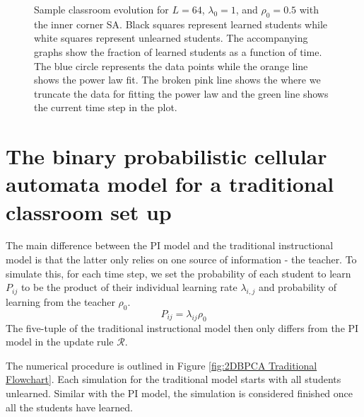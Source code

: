 \begin{figure}[htbp!]
    \caption{Sample classroom evolution for $L=64$, $\lambda_0 = 1$, and $\rho_0 = 0.5$ with the inner corner SA. Black squares represent learned students while white squares represent unlearned students. The accompanying graphs show the fraction of learned students as a function of time. The blue circle represents the data points while the orange line shows the power law fit. The broken pink line shows the where we truncate the data for fitting the power law and the green line shows the current time step in the plot.}
    \label{fig:Sample classroom evolution}
 \end{figure}

\section{The binary probabilistic cellular automata model for a traditional classroom set up}
The main difference between the PI model and the traditional instructional model is that the latter only relies on one source of information - the teacher. To simulate this, for each time step, we set the probability of each student to learn $P_{ij}$ to be the product of their individual learning rate $\lambda_{i,j}$ and probability of learning from the teacher $\rho_{0}$. 
\begin{equation}
    \label{eq:BPCA traditional learning probability}
        P_{ij} = \lambda_{ij} \rho_{0}
\end{equation}
The five-tuple of the traditional instructional model then only differs from the PI model in the update rule $\mathcal{R}$.

The numerical procedure is outlined in Figure \ref{fig:2DBPCA Traditional Flowchart}. Each simulation for the traditional model starts with all students unlearned. Similar with the PI model, the simulation is considered finished once all the students have learned.

